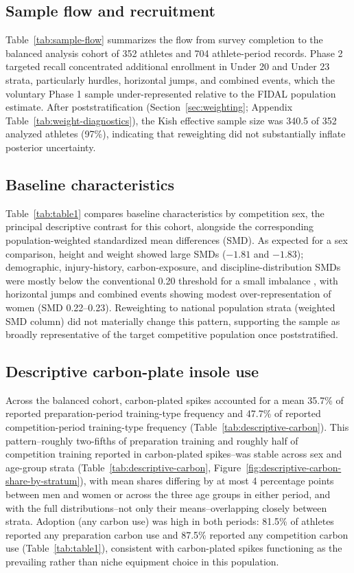 \subsection{Sample flow and recruitment}
\label{sec:results-flow}
Table~\ref{tab:sample-flow} summarizes the flow from survey completion to the balanced analysis cohort of 352 athletes and 704 athlete-period records. Phase 2 targeted recall concentrated additional enrollment in Under 20 and Under 23 strata, particularly hurdles, horizontal jumps, and combined events, which the voluntary Phase 1 sample under-represented relative to the FIDAL population estimate. After poststratification (Section~\ref{sec:weighting}; Appendix Table~\ref{tab:weight-diagnostics}), the Kish effective sample size was 340.5 of 352 analyzed athletes (97\%), indicating that reweighting did not substantially inflate posterior uncertainty.

\subsection{Baseline characteristics}
\label{sec:results-table1}
Table~\ref{tab:table1} compares baseline characteristics by competition sex, the principal descriptive contrast for this cohort, alongside the corresponding population-weighted standardized mean differences (SMD). As expected for a sex comparison, height and weight showed large SMDs ($-1.81$ and $-1.83$); demographic, injury-history, carbon-exposure, and discipline-distribution SMDs were mostly below the conventional 0.20 threshold for a small imbalance \citep{table1guidelines}, with horizontal jumps and combined events showing modest over-representation of women (SMD 0.22--0.23). Reweighting to national population strata (weighted SMD column) did not materially change this pattern, supporting the sample as broadly representative of the target competitive population once poststratified.

\subsection{Descriptive carbon-plate insole use}
\label{sec:results-descriptive}
Across the balanced cohort, carbon-plated spikes accounted for a mean 35.7\% of reported preparation-period training-type frequency and 47.7\% of reported competition-period training-type frequency (Table~\ref{tab:descriptive-carbon}). This pattern--roughly two-fifths of preparation training and roughly half of competition training reported in carbon-plated spikes--was stable across sex and age-group strata (Table~\ref{tab:descriptive-carbon}, Figure~\ref{fig:descriptive-carbon-share-by-stratum}), with mean shares differing by at most 4 percentage points between men and women or across the three age groups in either period, and with the full distributions--not only their means--overlapping closely between strata. Adoption (any carbon use) was high in both periods: 81.5\% of athletes reported any preparation carbon use and 87.5\% reported any competition carbon use (Table~\ref{tab:table1}), consistent with carbon-plated spikes functioning as the prevailing rather than niche equipment choice in this population.


